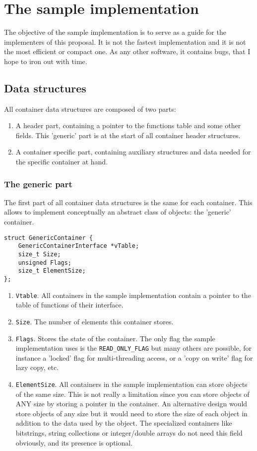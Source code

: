 \documentclass[12pt,a4paper]{memoir} %
\begin{document}
{{\chapter{The sample implementation}
The objective of the sample implementation is to serve as a guide for the implementers of this proposal. It is not the fastest implementation and it is not the most efficient or compact one. As any other software, it contains bugs, that I hope to iron out with time.

\section{Data structures}
All container data structures are composed of two parts:
\begin{enumerate}
\item A header part, containing a pointer to the functions table and some other fields. This 'generic' part is at the start of all container header structures.
\item A container specific part, containing auxiliary structures and data needed for the specific container at hand.
\end{enumerate}
\subsection{The generic part}
The first part of all container data structures is the same for each container. This allows to implement conceptually an abstract class of objects: the 'generic' container.
\begin{verbatim}
struct GenericContainer {
    GenericContainerInterface *vTable;
    size_t Size;
    unsigned Flags;
    size_t ElementSize;
};
\end{verbatim}
\begin{enumerate}
\item \texttt{Vtable}. All containers in the sample implementation contain a pointer to the table of functions of their interface.
\item \texttt{Size}. The number of elements this container stores.
\item \texttt{Flags}. Stores the state of the container. The only flag the sample implementation uses is the \texttt{READ\_ONLY\_FLAG} but many others are possible, for instance a 'locked' flag for multi-threading access, or a 'copy on write' flag for lazy copy, etc.
\item \texttt{ElementSize}. All containers in the sample implementation can store objects of the same size. This is not really a limitation since you can store objects of ANY size by storing a pointer in the container.
An alternative design would store objects of any size but it would need to store the size of each object in addition to the data used by the object. The specialized containers like bitstrings, string collections or integer/double arrays do not need this field obviously, and its presence is optional.
\end{enumerate}
}}
\end{document}
